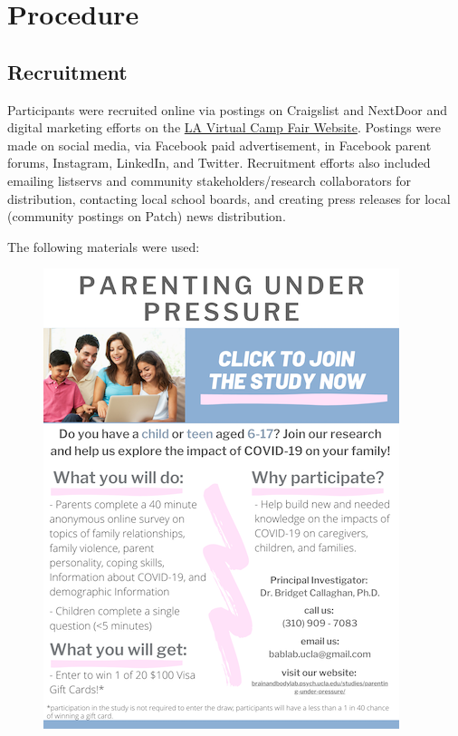\documentclass[]{book}
\begin{document}
\hypertarget{procedure}{%
\section{Procedure}\label{procedure}}

\hypertarget{recruitment}{%
\subsection{Recruitment}\label{recruitment}}

Participants were recruited online via postings on Craigslist and NextDoor and digital marketing efforts on the \href{https://www.vcampfair.com/brain-and-body-lab-ucla.html}{LA Virtual Camp Fair Website}. Postings were made on social media, via Facebook paid advertisement, in Facebook parent forums, Instagram, LinkedIn, and Twitter. Recruitment efforts also included emailing listservs and community stakeholders/research collaborators for distribution, contacting local school boards, and creating press releases for local (community postings on Patch) news distribution.

The following materials were used:

\begin{figure}
\centering
\includegraphics{images/PUP_flyer.png}
\caption{}
\end{figure}
\end{document}
